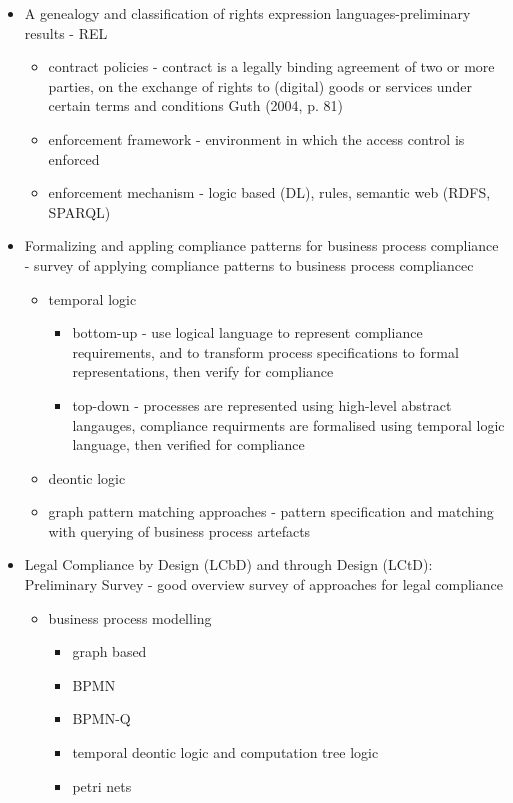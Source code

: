 \begin{itemize}
\item A genealogy and classification of rights expression languages-preliminary results - REL
	\begin{itemize}
	\item contract policies -  contract is a legally binding agreement of two or more parties, on the exchange of rights to (digital) goods or services under certain terms and conditions Guth (2004, p. 81)
	\item enforcement framework - environment in which the access control is enforced
	\item enforcement mechanism - logic based (DL), rules, semantic web (RDFS, SPARQL)
	\end{itemize}
\item Formalizing and appling compliance patterns for business process compliance - survey of applying compliance patterns to business process compliancec
	\begin{itemize}
	\item temporal logic
		\begin{itemize}
		\item bottom-up - use logical language to represent compliance requirements, and to transform process specifications to formal representations, then verify for compliance
		\item top-down - processes are represented using high-level abstract langauges, compliance requirments are formalised using temporal logic language, then verified for compliance
		\end{itemize}
	\item deontic logic 
	\item graph pattern matching approaches - pattern specification and matching with querying of business process artefacts
	\end{itemize}
\item Legal Compliance by Design (LCbD) and through Design (LCtD): Preliminary Survey - good overview survey of approaches for legal compliance
	\begin{itemize}
	\item business process modelling
		\begin{itemize}
		\item graph based 
		\item BPMN
		\item BPMN-Q
		\item temporal deontic logic and computation tree logic
		\item petri nets

\end{itemize}
\end{itemize}
\end{itemize}
